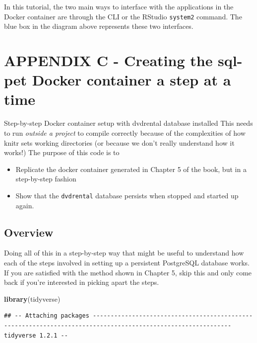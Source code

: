\documentclass[]{book}
\newenvironment{Shaded}{\begin{snugshade}}{\end{snugshade}}
\newcommand{\KeywordTok}[1]{\textcolor[rgb]{0.13,0.29,0.53}{\textbf{#1}}}
\newcommand{\NormalTok}[1]{#1}
\providecommand{\tightlist}{%
  \setlength{\itemsep}{0pt}\setlength{\parskip}{0pt}}
\theoremstyle{definition}
\theoremstyle{definition}
\theoremstyle{definition}
\theoremstyle{remark}
\begin{document}
In this tutorial, the two main ways to interface with the applications
in the Docker container are through the CLI or the RStudio
\texttt{system2} command. The blue box in the diagram above represents
these two interfaces.

\hypertarget{appendix-c---creating-the-sql-pet-docker-container-a-step-at-a-time}{%
\chapter{APPENDIX C - Creating the sql-pet Docker container a step at a
time}\label{appendix-c---creating-the-sql-pet-docker-container-a-step-at-a-time}}

Step-by-step Docker container setup with dvdrental database installed
This needs to run \emph{outside a project} to compile correctly because
of the complexities of how knitr sets working directories (or because we
don't really understand how it works!) The purpose of this code is to

\begin{itemize}
\tightlist
\item
  Replicate the docker container generated in Chapter 5 of the book, but
  in a step-by-step fashion
\item
  Show that the \texttt{dvdrental} database persists when stopped and
  started up again.
\end{itemize}

\hypertarget{overview-1}{%
\section{Overview}\label{overview-1}}

Doing all of this in a step-by-step way that might be useful to
understand how each of the steps involved in setting up a persistent
PostgreSQL database works. If you are satisfied with the method shown in
Chapter 5, skip this and only come back if you're interested in picking
apart the steps.

\begin{Shaded}
\begin{Highlighting}[]
\KeywordTok{library}\NormalTok{(tidyverse)}
\end{Highlighting}
\end{Shaded}

\begin{verbatim}
## -- Attaching packages ------------------------------------------------------------------------------------------------------------- tidyverse 1.2.1 --
\end{verbatim}
\end{document}
